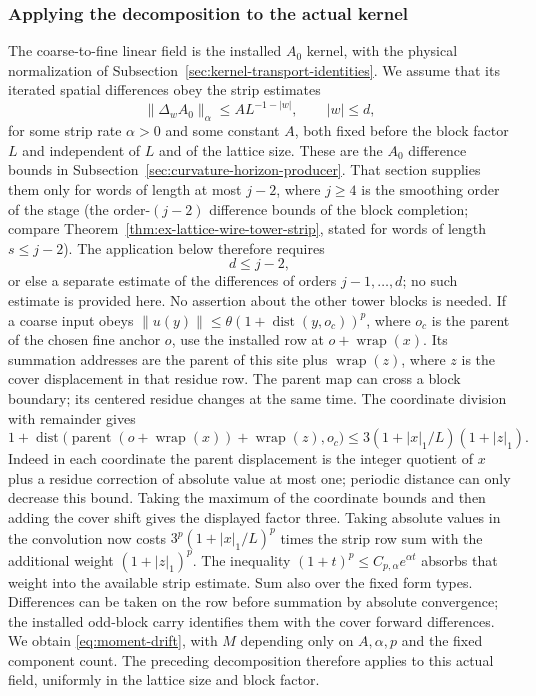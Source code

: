 \subsubsection{Applying the decomposition to the actual kernel}
The coarse-to-fine linear field is the installed $A_0$ kernel,
with the physical normalization of Subsection~\ref{sec:kernel-transport-identities}.
We assume that its iterated spatial differences obey the strip
estimates
\[
 \|\Delta_w A_0\|_\alpha\le A L^{-1-|w|},
                                      \qquad |w|\le d,
\]
for some strip rate $\alpha>0$ and some constant $A$, both fixed
before the block factor $L$ and independent of $L$ and of the lattice
size. These are the $A_0$ difference bounds in
Subsection~\ref{sec:curvature-horizon-producer}. That section supplies
them only for words of length at most $j-2$, where $j\ge4$ is the
smoothing order of the stage (the order-$(j-2)$ difference bounds of
the block completion; compare Theorem~\ref{thm:ex-lattice-wire-tower-strip},
stated for words of length $s\le j-2$). The application below
therefore requires
\[
 d\le j-2,
\]
or else a separate estimate of the differences of orders
$j-1,\dots,d$; no such estimate is provided here. No assertion about
the other tower blocks is needed. If a coarse
input obeys $\|u(y)\|\le\theta(1+\operatorname{dist}(y,o_c))^p$,
where $o_c$ is the parent of the chosen fine anchor $o$, use the
installed row at $o+\operatorname{wrap}(x)$. Its summation addresses
are the parent of this site plus $\operatorname{wrap}(z)$, where
$z$ is the cover displacement in that residue row. The parent
map can cross a block boundary; its centered residue changes at
the same time. The coordinate division with remainder gives
\[
 1+\operatorname{dist}\bigl(\operatorname{parent}
 (o+\operatorname{wrap}(x))+\operatorname{wrap}(z),o_c\bigr)
 \le3(1+|x|_1/L)(1+|z|_1).
\]
Indeed in each coordinate the parent displacement is the integer
quotient of $x$ plus a residue correction of absolute value at
most one; periodic distance can only decrease this bound. Taking
the maximum of the coordinate bounds and then adding the cover
shift gives the displayed factor three. Taking absolute values
in the convolution now costs $3^p(1+|x|_1/L)^p$ times the strip
row sum with the additional weight $(1+|z|_1)^p$. The inequality
$(1+t)^p\le C_{p,\alpha}e^{\alpha t}$ absorbs that weight into
the available strip estimate. Sum also over the fixed form types.
Differences can
be taken on the row before summation by absolute convergence;
the installed odd-block carry identifies them with the cover
forward differences. We obtain \eqref{eq:moment-drift}, with
$M$ depending only on $A,\alpha,p$ and the fixed component count.
The preceding decomposition therefore applies to this actual
field, uniformly in the lattice size and block factor.

